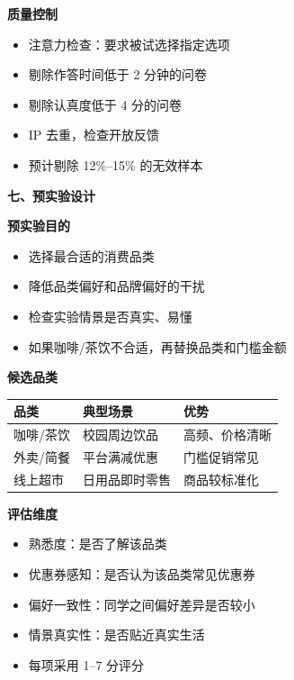 \documentclass[aspectratio=169,UTF8,zihao=-4]{ctexbeamer}
\newcommand{\bigidea}[1]{
  \begin{center}
    \vspace{0.8em}
    {\LARGE \bfseries #1}
    \vspace{0.6em}
  \end{center}
}
\newcommand{\sectionpageframe}[1]{
  \begin{frame}[plain]
    \begin{center}
      \vfill
      {\Huge \bfseries #1}
      \vfill
    \end{center}
  \end{frame}
}
\begin{document}
\begin{frame}
  \bigidea{质量控制}
  \begin{itemize}
    \item \Large 注意力检查：要求被试选择指定选项
    \item \Large 剔除作答时间低于 2 分钟的问卷
    \item \Large 剔除认真度低于 4 分的问卷
    \item \Large IP 去重，检查开放反馈
    \item \Large 预计剔除 12\%--15\% 的无效样本
  \end{itemize}
\end{frame}

\sectionpageframe{七、预实验设计}

\begin{frame}
  \bigidea{预实验目的}
  \begin{itemize}
    \item \Large 选择最合适的消费品类
    \item \Large 降低品类偏好和品牌偏好的干扰
    \item \Large 检查实验情景是否真实、易懂
    \item \Large 如果咖啡/茶饮不合适，再替换品类和门槛金额
  \end{itemize}
\end{frame}

\begin{frame}
  \bigidea{候选品类}
  \centering
  \large
  \begin{tabular}{lll}
    \toprule
    品类 & 典型场景 & 优势 \\
    \midrule
    咖啡/茶饮 & 校园周边饮品 & 高频、价格清晰 \\
    外卖/简餐 & 平台满减优惠 & 门槛促销常见 \\
    线上超市 & 日用品即时零售 & 商品较标准化 \\
    \bottomrule
  \end{tabular}
\end{frame}

\begin{frame}
  \bigidea{评估维度}
  \begin{itemize}
    \item \Large 熟悉度：是否了解该品类
    \item \Large 优惠券感知：是否认为该品类常见优惠券
    \item \Large 偏好一致性：同学之间偏好差异是否较小
    \item \Large 情景真实性：是否贴近真实生活
    \item \Large 每项采用 1--7 分评分
  \end{itemize}
\end{frame}
\end{document}

